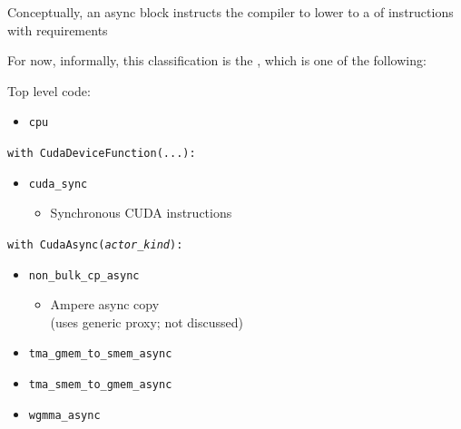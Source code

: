 \begin{minipage}[t]{0.48\textwidth}\fixminipage
Conceptually, an async block instructs the compiler to lower to a  of instructions with  requirements

For now, informally, this classification is the , which is one of the following:

\vspace{4mm}

Top level code:
\begin{itemize}
  \item \texttt{cpu}
\end{itemize}
\vspace{4mm}

\texttt{with CudaDeviceFunction(...):}
\begin{itemize}
  \item \texttt{cuda\_sync}
  \begin{itemize}
    \item Synchronous CUDA instructions
  \end{itemize}
\end{itemize}
\vspace{4mm}

\texttt{with CudaAsync(\textit{actor\_kind}):}
\begin{itemize}
  \item \texttt{non\_bulk\_cp\_async}
  \begin{itemize}
    \item Ampere async copy\\(uses generic proxy; not discussed)
  \end{itemize}
  \item \texttt{tma\_gmem\_to\_smem\_async}
  \item \texttt{tma\_smem\_to\_gmem\_async}
  \item \texttt{wgmma\_async}
\end{itemize}
\end{minipage}
\hfill
